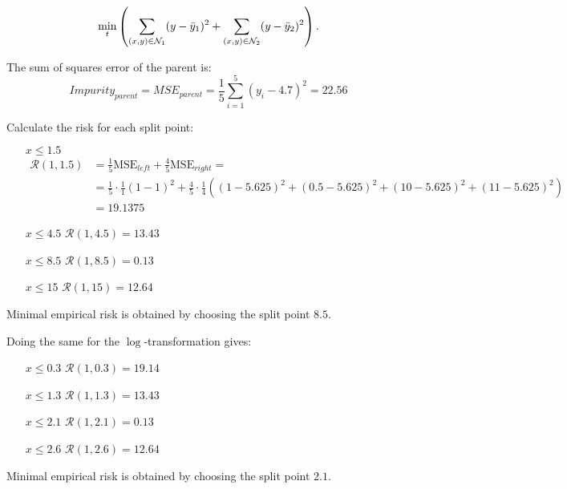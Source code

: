 \documentclass[a4paper]{article}
\begin{document}
{\begin{itemize}
  \begin{align*}
  \min_{t} \left(\sum_{(x,y) \in \mathcal{N}_1} (y - \bar{y}_1)^2 + \sum_{(x,y) \in \mathcal{N}_2} (y - \bar{y}_2)^2 \right).
  \end{align*}

  The sum of squares error of the parent is:
  $$Impurity_{parent} = MSE_{parent} = \frac{1}{5} \sum_{i=1}^5 (y_i - 4.7)^2 = 22.56 $$

  Calculate the risk for each split point:

  \begin{itemize}
    \item[$x \leq 1.5$]
      \begin{align*}
        \mathcal{R}(1, 1.5) &= \frac{1}{5}\text{MSE}_{left} + \frac{4}{5}\text{MSE}_{right}  =  \\
        &= \frac{1}{5} \cdot \frac{1}{1}(1 - 1)^2 + \frac{4}{5} \cdot\frac{1}{4}((1 - 5.625)^2 + (0.5 - 5.625)^2 + (10 - 5.625)^2 + (11 - 5.625)^2) \\
        &= 19.1375
      \end{align*}

    \item[$x \leq 4.5$] $\mathcal{R}(1, 4.5) = 13.43$
    \item[$x \leq 8.5$] $\mathcal{R}(1, 8.5) = 0.13$
    \item[$x \leq 15$] $\mathcal{R}(1, 15) = 12.64$

  \end{itemize}

  Minimal empirical risk is obtained by choosing the split point $8.5$.

  Doing the same for the $\log$-transformation gives:
  \begin{itemize}
    \item[$x \leq 0.3$] $\mathcal{R}(1, 0.3) = 19.14$
    \item[$x \leq 1.3$] $\mathcal{R}(1, 1.3) = 13.43$
    \item[$x \leq 2.1$] $\mathcal{R}(1, 2.1) = 0.13$
    \item[$x \leq 2.6$] $\mathcal{R}(1, 2.6) = 12.64$
  \end{itemize}

  Minimal empirical risk is obtained by choosing the split point $2.1$.



\end{itemize}}
\end{document}
